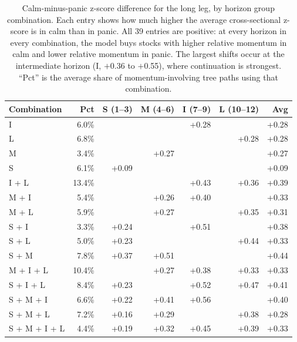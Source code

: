 \begin{table}[H]
\centering
\small
\begin{tabular}{l r r r r r r}
\toprule
Combination & Pct & S (1--3) & M (4--6) & I (7--9) & L (10--12) & Avg \\
\midrule
I & 6.0\% &  &  & +0.28 &  & +0.28 \\
L & 6.8\% &  &  &  & +0.28 & +0.28 \\
M & 3.4\% &  & +0.27 &  &  & +0.27 \\
S & 6.1\% & +0.09 &  &  &  & +0.09 \\
I {+} L & 13.4\% &  &  & +0.43 & +0.36 & +0.39 \\
M {+} I & 5.4\% &  & +0.26 & +0.40 &  & +0.33 \\
M {+} L & 5.9\% &  & +0.27 &  & +0.35 & +0.31 \\
S {+} I & 3.3\% & +0.24 &  & +0.51 &  & +0.38 \\
S {+} L & 5.0\% & +0.23 &  &  & +0.44 & +0.33 \\
S {+} M & 7.8\% & +0.37 & +0.51 &  &  & +0.44 \\
M {+} I {+} L & 10.4\% &  & +0.27 & +0.38 & +0.33 & +0.33 \\
S {+} I {+} L & 8.4\% & +0.23 &  & +0.52 & +0.47 & +0.41 \\
S {+} M {+} I & 6.6\% & +0.22 & +0.41 & +0.56 &  & +0.40 \\
S {+} M {+} L & 7.2\% & +0.16 & +0.29 &  & +0.38 & +0.28 \\
S {+} M {+} I {+} L & 4.4\% & +0.19 & +0.32 & +0.45 & +0.39 & +0.33 \\
\bottomrule
\end{tabular}
\caption{Calm-minus-panic z-score difference for the long leg, by horizon group combination. Each entry shows how much higher the average cross-sectional z-score is in calm than in panic. All 39 entries are positive: at every horizon in every combination, the model buys stocks with higher relative momentum in calm and lower relative momentum in panic. The largest shifts occur at the intermediate horizon (I, $+$0.36 to $+$0.55), where continuation is strongest. ``Pct'' is the average share of momentum-involving tree paths using that combination.}
\label{tab:combo_long_cp}
\end{table}
